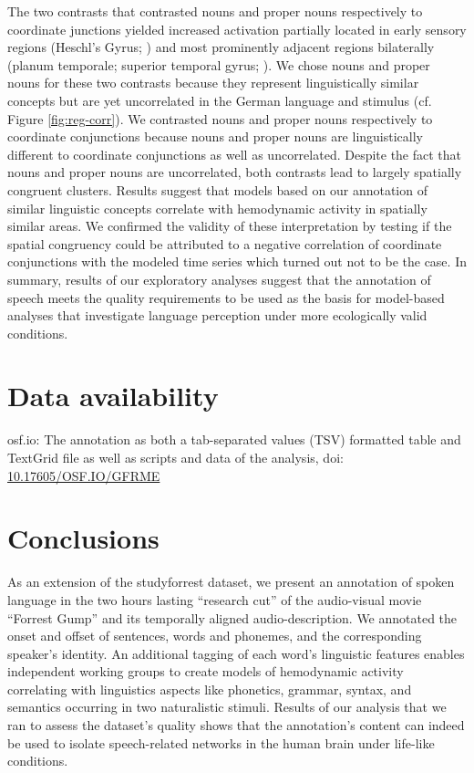 \documentclass[10pt,a4paper,onecolumn]{article}
\begin{document}
The two contrasts that contrasted nouns and proper nouns respectively to
coordinate junctions yielded increased activation partially located in early
sensory regions (Heschl's Gyrus; \citep{saenz2014tonotopic}) and most
prominently adjacent regions bilaterally (planum temporale; superior temporal
gyrus; \citep{arsenault2015distributed, mesgarani2014phonetic}).
We chose nouns and proper nouns for these two contrasts because they represent
linguistically similar concepts but are yet uncorrelated in the German language
and stimulus (cf. Figure \ref{fig:reg-corr}).
We contrasted nouns and proper nouns respectively to coordinate conjunctions
because nouns and proper nouns are linguistically different to coordinate
conjunctions as well as uncorrelated.
Despite the fact that
nouns and proper nouns are uncorrelated, both contrasts lead to largely
spatially congruent clusters. Results suggest that models based on our
annotation of similar linguistic concepts correlate with hemodynamic activity in
spatially similar areas.
We confirmed the validity of these interpretation by testing if the spatial
congruency could be attributed to a negative correlation of coordinate
conjunctions with the modeled time series which turned out not to be the case.
In summary, results of our exploratory analyses suggest that the annotation of
speech meets the quality requirements to be used as the basis for model-based
analyses that investigate language perception under more ecologically valid
conditions.


\section*{Data availability}

osf.io: The annotation as both a tab-separated values (TSV) formatted table and
TextGrid file as well as scripts and data of the analysis, doi:
\href{dx.doi.org/10.17605/OSF.IO/GFRME}{10.17605/OSF.IO/GFRME}


\section*{Conclusions}
As an extension of the studyforrest dataset, we present an annotation of spoken
language in the two hours lasting ``research cut'' of the audio-visual movie
``Forrest Gump'' and its temporally aligned audio-description.
We annotated the onset and offset of sentences, words and phonemes, and the
corresponding speaker's identity.
An additional tagging of each word's linguistic features enables independent
working groups to create models of hemodynamic activity
correlating with linguistics aspects like phonetics, grammar, syntax, and
semantics occurring in two naturalistic stimuli.
Results of our analysis that we ran to assess the dataset's quality shows that
the annotation's content can indeed be used to isolate speech-related networks
in the human brain under life-like conditions.
\end{document}
